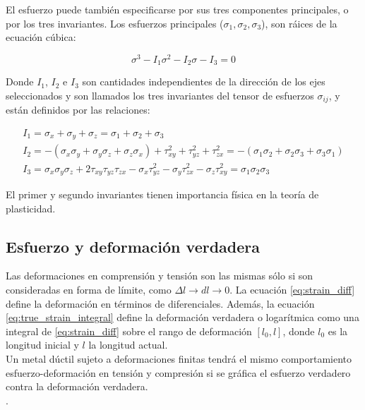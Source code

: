 El esfuerzo puede también especificarse por sus tres componentes principales, o por 
los tres invariantes. Los esfuerzos principales ($\sigma_1, \sigma_2, \sigma_3$), son 
ráices de la ecuación cúbica:

\begin{equation}
\sigma^3 - I_1 \sigma^2 - I_2 \sigma - I_3 = 0
\end{equation}

Donde $I_1$, $I_2$ e $I_3$ son cantidades independientes de la dirección de los ejes 
seleccionados y son llamados los tres invariantes del tensor de esfuerzos $\sigma_{ij}$, y están definidos 
por las relaciones:

\begin{align}
I_1 = \sigma_x + \sigma_y + \sigma_z = \sigma_1 + \sigma_2 + \sigma_3 \\
I_2 = -\left( \sigma_x \sigma_y + \sigma_y \sigma_z + \sigma_z \sigma_x \right) + \tau_{xy}^2 + 
\tau_{yz}^2 + \tau_{zx}^2 = -(\sigma_1 \sigma_2 + \sigma_2 \sigma_3 + \sigma_3 \sigma_1) \\
I_3 = \sigma_x \sigma_y \sigma_z + 2 \tau_{xy} \tau_{yz} \tau_{zx} - \sigma_x \tau_{yz}^2 - \sigma_y \tau_{zx}^2 - 
\sigma_z \tau_{xy}^2 = \sigma_1 \sigma_2 \sigma_3
\end{align}

El primer y segundo invariantes tienen importancia física en la teoría de plasticidad.

\subsection{Esfuerzo y deformación verdadera} \label{subsec:true_strain_stress}

Las deformaciones en comprensión y tensión son las mismas sólo si son consideradas 
en forma de límite, como $\Delta l \to dl  \to 0$. La ecuación \ref{eq:strain_diff} 
define la deformación en términos de diferenciales. Además, la ecuación 
\ref{eq:true_strain_integral} define la deformación verdadera o logarítmica como una integral 
de \ref{eq:strain_diff} sobre el rango de deformación $[l_0, l]$, donde 
$l_0$ es la longitud inicial y $l$ la longitud actual.\\

Un metal dúctil sujeto a deformaciones finitas tendrá el mismo comportamiento esfuerzo-deformación 
en tensión y compresión si se gráfica el esfuerzo verdadero contra la deformación verdadera.
~\cite{abaqus-gs-manual} \\.

